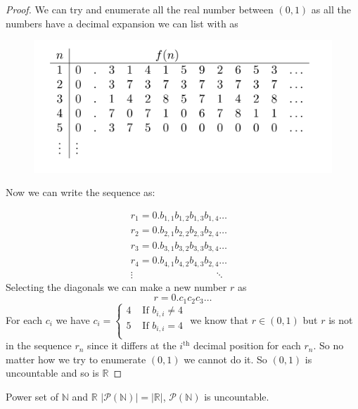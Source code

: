 \documentclass[16pt,a4paper]{article}
\theoremstyle{definition}
\begin{document}
\begin{proof}
We can try and enumerate all the real number between $(0,1)$ as all the numbers have a decimal expansion we can list with as

\begin{figure}[hbtp]
\centering
\includegraphics[scale=0.3]{figs/fig1.png}
\end{figure}
Now we can write the sequence as:

\begin{align*}
r_1 = 0.\boxed{b_{1,1}}b_{1,2}b_{1,3}b_{1,4}\ldots \\
r_2 = 0.b_{2,1}\boxed{b_{2,2}}b_{2,3}b_{2,4}\ldots \\
r_3 = 0.b_{3,1}{b_{3,2}}\boxed{b_{3,3}}b_{3,4}\ldots \\
r_4 = 0.b_{4,1}{b_{4,2}}b_{4,3}\boxed{b_{2,4}}\ldots \\
\vdots\;\;\;\;\;\;\qquad\qquad\qquad\;\;\ddots \quad
\end{align*}
Selecting the diagonals we can make a new number $r$ as 
\[r = 0.c_1 c_2 c_3 \ldots\] 
 For each $c_i$ we have $c_i = \begin{cases}
4 & \text{ If $b_{i,i} \neq 4$}\\
5 & \text{ If $b_{i,i} = 4$}\\
 \end{cases}$ we know that $r\in (0,1)$ but $r$ is not in the sequence $r_n$ since it differs at the $i^\text{th}$ decimal position for each $r_n$. So no matter how we try to enumerate $(0,1)$ we cannot do it. So $(0,1)$ is uncountable and so is $\mathbb{R}$ 
\end{proof} 


\begin{thm}{Power set of $\mathbb{N}$ and $\mathbb{R}$}{}
$|\mathcal{P}(\mathbb{N})| = |\mathbb{R}|$, $\mathcal{P}(\mathbb{N})$ is uncountable. 
\end{thm}
\end{document}

